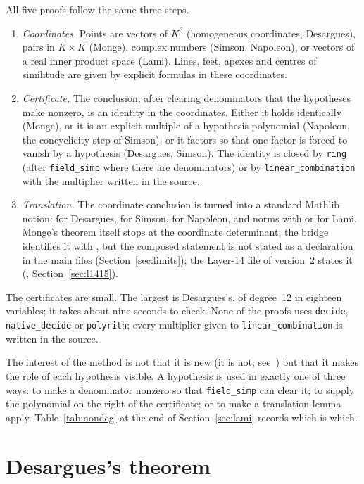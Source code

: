 \documentclass[11pt]{article}
\theoremstyle{definition}
\theoremstyle{remark}
\newcommand{\lean}[1]{\texttt{#1}}
\begin{document}
All five proofs follow the same three steps.
\begin{enumerate}
\item \emph{Coordinates.} Points are vectors of $K^3$ (homogeneous coordinates, Desargues),
pairs in $K\times K$ (Monge), complex numbers (Simson, Napoleon), or vectors of a real inner
product space (Lami). Lines, feet, apexes and centres of similitude are given by explicit
formulas in these coordinates.
\item \emph{Certificate.} The conclusion, after clearing denominators that the hypotheses make
nonzero, is an identity in the coordinates. Either it holds identically (Monge), or it is an
explicit multiple of a hypothesis polynomial (Napoleon, the concyclicity step of Simson), or it
factors so that one factor is forced to vanish by a hypothesis (Desargues, Simson). The identity
is closed by \lean{ring} (after \lean{field\_simp} where there are denominators) or by
\lean{linear\_combination} with the multiplier written in the source.
\item \emph{Translation.} The coordinate conclusion is turned into a standard Mathlib notion:
 for Desargues,  for Simson, 
for Napoleon, and norms with  or  for
Lami. Monge's theorem itself stops at the coordinate determinant; the bridge
 identifies it with , but the composed
statement is not stated as a declaration in the main files (Section~\ref{sec:limits}); the
Layer-14 file of version~2 states it (, Section~\ref{sec:l1415}).
\end{enumerate}
The certificates are small. The largest is Desargues's, of degree~12 in eighteen variables; it
takes about nine seconds to check. None of the proofs uses \lean{decide}, \lean{native\_decide} or
\lean{polyrith}; every multiplier given to \lean{linear\_combination} is written in the source.

The interest of the method is not that it is new (it is not; see~\cite{Chou}) but that it makes
the role of each hypothesis visible. A hypothesis is used in exactly one of three ways: to make a
denominator nonzero so that \lean{field\_simp} can clear it; to supply the polynomial on the right
of the certificate; or to make a translation lemma apply. Table~\ref{tab:nondeg} at the end of
Section~\ref{sec:lami} records which is which.

\section{Desargues's theorem}\label{sec:desargues}
\end{document}
